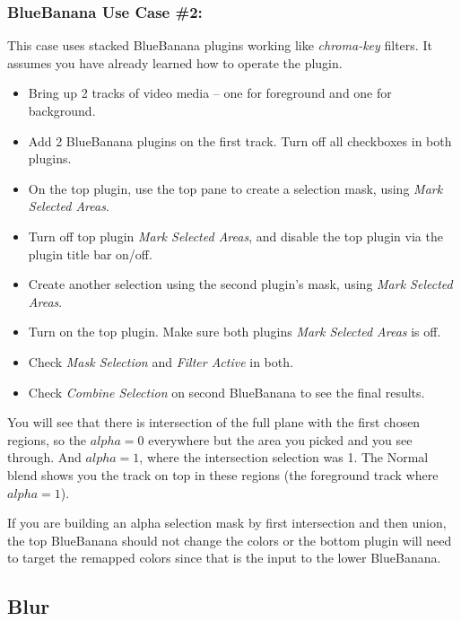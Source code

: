 \subsubsection*{BlueBanana Use Case \#2:}
\label{ssub:bb_use_case_2}

This case uses stacked BlueBanana plugins working like \textit{chroma-key} filters. It assumes you have already learned how to operate the plugin.

\begin{itemize}
        \item Bring up 2 tracks of video media -- one for foreground and one for background.
        \item Add 2 BlueBanana plugins on the first track. Turn off all checkboxes in both plugins.
        \item On the top plugin, use the top pane to create a selection mask, using \textit{Mark Selected Areas}.
        \item Turn off top plugin \textit{Mark Selected Areas}, and disable the top plugin via the plugin title bar on/off.
        \item Create another selection using the second plugin's mask, using \textit{Mark Selec\-ted Areas}.
        \item Turn on the top plugin. Make sure both plugins \textit{Mark Selected Areas} is off.
        \item Check \textit{Mask Selection} and \textit{Filter Active} in both.
        \item Check \textit{Combine Selection} on second BlueBanana to see the final results.
\end{itemize}

You will see that there is intersection of the full plane with the first chosen regions, so the $alpha = 0$ everywhere but the area you picked and you see through. And $alpha = 1$, where the intersection selection was 1. The Normal blend shows you the track on top in these regions (the foreground track where $alpha = 1$).

If you are building an alpha selection mask by first intersection and then union, the top BlueBanana should not change the colors or the bottom plugin will need to target the remapped colors since that is the input to the lower BlueBanana.

\subsection{Blur}%
\label{sub:blur}

